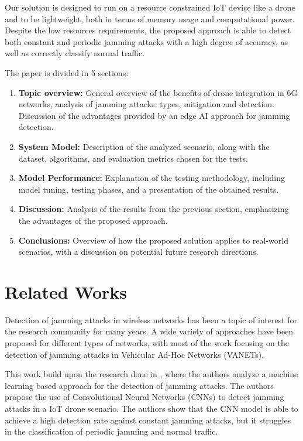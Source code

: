 \documentclass[futureinternet,article,submit,pdftex,moreauthors]{Definitions/mdpi}
\begin{document}
Our solution is designed to run on a resource constrained IoT device like a drone and to be lightweight, both in terms of memory usage and computational power.
Despite the low resources requirements, the proposed approach is able to detect both constant and periodic jamming attacks with a high degree of accuracy, as well as correctly classify normal traffic. 

The paper is divided in 5 sections: 
\begin{enumerate}
	\item \textbf{Topic overview:} General overview of the benefits of drone integration in 6G networks, analysis of jamming attacks: types, mitigation and detection. Discussion of the advantages provided by an edge AI approach for jamming detection. 
	\item \textbf{System Model:} Description of the analyzed scenario, along with the dataset, algorithms, and evaluation metrics chosen for the tests.
	\item \textbf{Model Performance:} Explanation of the testing methodology, including model tuning, testing phases, and a presentation of the obtained results.
	\item \textbf{Discussion:} Analysis of the results from the previous section, emphasizing the advantages of the proposed approach.
	\item \textbf{Conclusions:} Overview of how the proposed solution applies to real-world scenarios, with a discussion on potential future research directions.
\end{enumerate}

\section{Related Works}

Detection of jamming attacks in wireless networks has been a topic of interest for the research community for many years. A wide variety of approaches have been proposed for different types of networks, with most of the work focusing on the detection of jamming attacks in Vehicular Ad-Hoc Networks (VANETs)\cite{VANETsAI-Lyamin}.

This work build upon the research done in \cite{JammingDetectionIoT-Hussain}, where the authors analyze a machine learning based approach for the detection of jamming attacks. 
The authors propose the use of Convolutional Neural Networks (CNNs) to detect jamming attacks in a IoT drone scenario. The authors show that the CNN model is able to achieve a high detection rate against constant jamming attacks, but it 
struggles in the classification of periodic jamming and normal traffic. 
\end{document}
